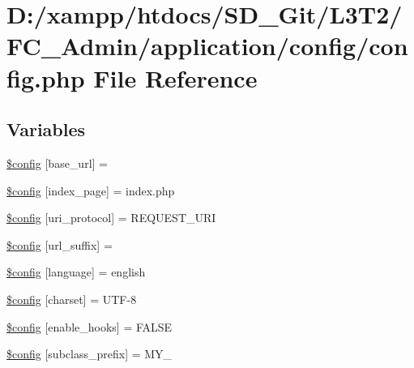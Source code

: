 \hypertarget{application_2config_2config_8php}{}\section{D\+:/xampp/htdocs/\+S\+D\+\_\+\+Git/\+L3\+T2/\+F\+C\+\_\+\+Admin/application/config/config.php File Reference}
\label{application_2config_2config_8php}
\subsection*{Variables}
\begin{DoxyCompactItemize}
\item 
\hyperlink{application_2config_2config_8php_a8063081991a9d7087e6aea78db95a524}{\$config} \mbox{[}\textquotesingle{}base\+\_\+url\textquotesingle{}\mbox{]} = \textquotesingle{}\textquotesingle{}
\item 
\hyperlink{application_2config_2config_8php_a64d47dc21f6eab24bf747cae9da5e7bb}{\$config} \mbox{[}\textquotesingle{}index\+\_\+page\textquotesingle{}\mbox{]} = \textquotesingle{}index.\+php\textquotesingle{}
\item 
\hyperlink{application_2config_2config_8php_a37a0ed82a5db3c3aebdc12611e1e4498}{\$config} \mbox{[}\textquotesingle{}uri\+\_\+protocol\textquotesingle{}\mbox{]} = \textquotesingle{}R\+E\+Q\+U\+E\+S\+T\+\_\+\+U\+R\+I\textquotesingle{}
\item 
\hyperlink{application_2config_2config_8php_a40da61bb27389d4c21a1271840ec7c40}{\$config} \mbox{[}\textquotesingle{}url\+\_\+suffix\textquotesingle{}\mbox{]} = \textquotesingle{}\textquotesingle{}
\item 
\hyperlink{application_2config_2config_8php_ae05e29ba794fe4453013dd7b1cc30219}{\$config} \mbox{[}\textquotesingle{}language\textquotesingle{}\mbox{]} = \textquotesingle{}english\textquotesingle{}
\item 
\hyperlink{application_2config_2config_8php_ac9128ac0276b1b7acf4c96a22b2469f1}{\$config} \mbox{[}\textquotesingle{}charset\textquotesingle{}\mbox{]} = \textquotesingle{}U\+T\+F-\/8\textquotesingle{}
\item 
\hyperlink{application_2config_2config_8php_a2d80c3b160b2bb6f3329a9b07e970c51}{\$config} \mbox{[}\textquotesingle{}enable\+\_\+hooks\textquotesingle{}\mbox{]} = F\+A\+L\+S\+E
\item 
\hyperlink{application_2config_2config_8php_a51b79c9e455d64cb54212f2966b28ae6}{\$config} \mbox{[}\textquotesingle{}subclass\+\_\+prefix\textquotesingle{}\mbox{]} = \textquotesingle{}M\+Y\+\_\+\textquotesingle{}

\end{DoxyCompactItemize}
